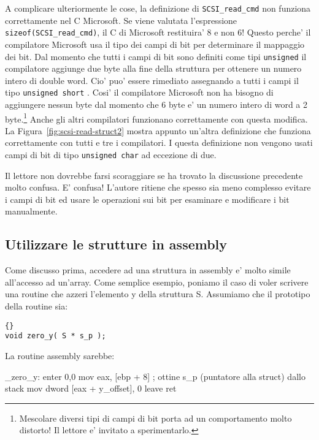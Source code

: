 A complicare ulteriormente le cose, la definizione di \lstinline|SCSI_read_cmd|
non funziona correttamente nel C Microsoft. Se viene valutata
l'espressione \lstinline|sizeof(SCSI_read_cmd)|, il C di Microsoft
restituira' 8 e non 6! Questo perche' il compilatore Microsoft usa
il tipo dei campi di bit per determinare il mappaggio dei bit.
Dal momento che tutti i campi di bit sono definiti come tipi \lstinline|unsigned|
il compilatore aggiunge due byte alla fine della struttura per ottenere
un numero intero di double word. Cio' puo' essere rimediato assegnando
a tutti i campi il tipo \lstinline|unsigned short| . Cosi' il compilatore
Microsoft non ha bisogno di aggiungere nessun byte dal momento che 6
byte e' un numero intero di word a 2 byte.\footnote{Mescolare diversi
tipi di campi di bit porta ad un comportamento molto distorto! Il 
lettore e' invitato a sperimentarlo.} Anche gli altri compilatori
funzionano correttamente con questa modifica. La Figura~\ref{fig:scsi-read-struct2}
mostra appunto un'altra definizione che funziona correttamente con 
tutti e tre i compilatori. I questa definizione non vengono usati
campi di bit di tipo \lstinline|unsigned char| ad eccezione di due.

Il lettore non dovrebbe farsi scoraggiare se ha trovato la discussione 
precedente molto confusa. E' confusa! L'autore ritiene che spesso 
sia meno complesso evitare i campi di bit ed usare le operazioni sui
bit per esaminare e modificare i bit manualmente.



\subsection{Utilizzare le strutture in assembly}

Come discusso prima, accedere ad una struttura in assembly e' molto
simile all'accesso ad un'array. Come semplice esempio, poniamo il caso
di voler scrivere una routine che azzeri l'elemento {\code y} della
struttura {\code S}. Assumiamo che il prototipo della routine sia:
\begin{lstlisting}[stepnumber=0]{}
void zero_y( S * s_p );
\end{lstlisting}
\noindent La routine assembly sarebbe:
\begin{AsmCodeListing}
_zero_y:
      enter  0,0
      mov    eax, [ebp + 8]      ; ottine s_p (puntatore alla struct) dallo stack
      mov    dword [eax + y_offset], 0
      leave
      ret
\end{AsmCodeListing}

